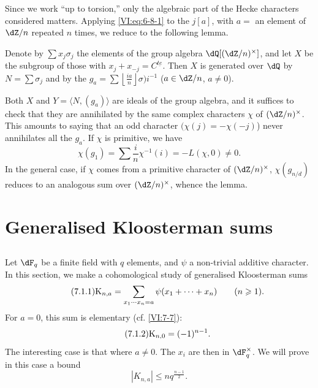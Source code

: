 Since we work ``up to torsion,'' only the algebraic part
of the Hecke characters considered matters. Applying \eqref{VI:eq:6-8-1} to
the $j[a]$, with $a=$ an element of $\dZ/n$ repeated $n$ times, we
reduce to the following lemma.





\begin{lemma_}\label{VI:6-12}
Denote by $\sum x_j \sigma_j$ the elements of the group algebra
$\dQ[(\dZ/n)^\times]$, and let $X$ be the subgroup of those with
$x_j+x_{-j}=C^{\underline{t e}}$. Then $X$ is generated over $\dQ$ by
$N=\sum \sigma_j$ and by the
$g_a=\sum \left\lfloor \frac{i a}{n}\right\rfloor \sigma)i^{-1}$
($a\in \dZ/n$, $a\ne 0$).
\end{lemma_}

Both $X$ and $Y=\langle N,(g_a)\rangle$ are ideals of the group
algebra, and it suffices to check that they are annihilated by the same
complex characters $\chi$ of $(\dZ/n)^\times$. This amounts to saying that an
odd character $(\chi(j)=-\chi(-j)$) never annihilates all the $g_a$. If
$\chi$ is primitive, we have 
\[
  \chi(g_1) = \sum \frac i n \chi^{-1}(i) = -L(\chi,0)\ne 0 \text{.} 
\]
In the general case, if $\chi$ comes from a primitive character of
$(\dZ/n)^\times$, $\chi(g_{n/d})$ reduces to an analogous sum over
$(\dZ/n)^\times$, whence the lemma. 










\section{Generalised Kloosterman sums}\label{VI:7}





\subsection{}\label{VI:7-1}

Let $\dF_q$ be a finite field with $q$ elements, and $\psi$ a
non-trivial additive character. In this section, we make a cohomological study
of generalised Kloosterman sums 
\begin{equation*}\tag{7.1.1}\label{VI;eq:7-1-1}
  \textnormal{K}_{n,a} = \sum_{x_1\dotsm x_n = a} \psi(x_1+\cdots + x_n) \qquad (n\geqslant 1) \text{.} 
\end{equation*}
For $a=0$, this sum is elementary (cf. \ref{VI:7-7}): 
\begin{equation*}\tag{7.1.2}\label{VI:eq:7-1-2}
  \textnormal{K}_{n,0} = (-1)^{n-1} \text{.} 
\end{equation*}
The interesting case is that where $a\ne 0$. The $x_i$ are then in
$\dF_q^\times$. We will prove in this case a bound 
\begin{equation*}\tag{7.1.3}\label{VI:eq:7-1-3}
  \left|K_{n,a}\right| \leqslant n q^{\frac{n-1}{2}} \text{.} 
\end{equation*}

